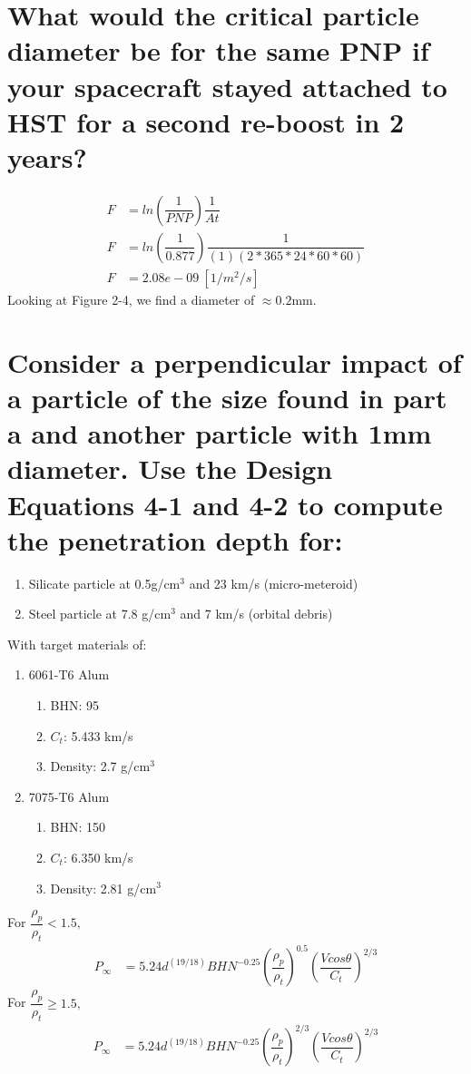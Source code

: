\documentclass[onecolumn,10pt]{jhwhw}
\begin{document}
\part{What would the critical particle diameter be for the same PNP if your spacecraft stayed attached to HST for a second re-boost in 2 years?}
\begin{align*}
F &= ln(\dfrac{1}{PNP}) \dfrac{1}{At}\\
F &= ln(\dfrac{1}{0.877}) \dfrac{1}{(1)(2*365*24*60*60)}\\
F &= 2.08e-09~[1/m^2/s]
\end{align*}
\noindent Looking at Figure 2-4, we find a diameter of $\approx 0.2$mm.

\part{Consider a perpendicular impact of a particle of the size found in part a and another particle with 1mm diameter. Use the Design Equations 4-1 and 4-2 to compute the penetration depth for:}
\begin{enumerate}
\item Silicate particle at 0.5g/cm$^3$ and 23 km/s (micro-meteroid)
\item Steel particle at 7.8 g/cm$^3$ and 7 km/s (orbital debris)
\end{enumerate}
With target materials of:
\begin{enumerate}
\item 6061-T6 Alum
\begin{enumerate}
\item BHN: 95
\item $C_t$: 5.433 km/s
\item Density: 2.7 g/cm$^3$
\end{enumerate}
\item 7075-T6 Alum
\begin{enumerate}
\item BHN: 150
\item $C_t$: 6.350 km/s
\item Density: 2.81 g/cm$^3$
\end{enumerate}
\end{enumerate}

\noindent For $\dfrac{\rho_p}{\rho_t} < 1.5,$
\begin{align*}
P_{\infty} &= 5.24 d^{(19/18)} BHN^{-0.25} \left(\dfrac{\rho_p}{\rho_t}\right)^{0.5} \left(\dfrac{V cos \theta}{C_t}\right)^{2/3}
\end{align*}
For $\dfrac{\rho_p}{\rho_t} \geq 1.5,$
\begin{align*}
P_{\infty} &= 5.24 d^{(19/18)} BHN^{-0.25} \left(\dfrac{\rho_p}{\rho_t}\right)^{2/3} \left(\dfrac{V cos \theta}{C_t}\right)^{2/3}
\end{align*}
\end{document}
